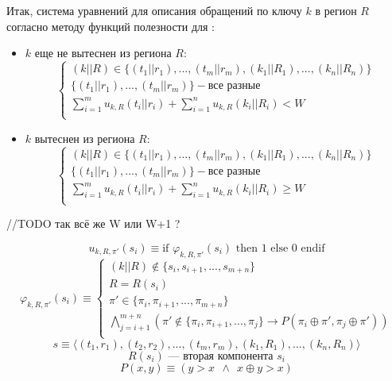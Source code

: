 Итак, система уравнений для описания обращений по ключу $k$ в регион $R$
согласно методу функций полезности для \PseudoLRU:
\begin{itemize}
\item $k$ еще не вытеснен из региона $R$:
$$
\left\{\begin{array}{l}
(k||R) \in \{(t_1||r_1), ..., (t_m||r_m), (k_1||R_1), ..., (k_n||R_n)\}\\
\{(t_1||r_1), ..., (t_m||r_m)\} - \mbox{все разные}\\
\sum\limits_{i=1}^m u_{k,R}(t_i||r_i) + \sum\limits_{i=1}^n u_{k,R}(k_i||R_i) < W\\
\end{array} \right.
$$
\item $k$ вытеснен из региона $R$:
$$
\left\{\begin{array}{l} (k||R) \in \{(t_1||r_1), ..., (t_m||r_m), (k_1||R_1),
..., (k_n||R_n)\}\\
\{(t_1||r_1), ..., (t_m||r_m)\} - \mbox{все разные}\\
\sum\limits_{i=1}^m u_{k,R}(t_i||r_i) + \sum\limits_{i=1}^n u_{k,R}(k_i||R_i) \geqslant W\\
\end{array} \right.
$$
\end{itemize}

//TODO так всё же W или W+1 ?

$$u_{k,R,\pi'} (s_i) \equiv \mbox{if~} \varphi_{k,R,\pi'} (s_i) \mbox{~then 1 else 0 endif}$$
$$\varphi_{k,R,\pi'} (s_i) \equiv \left\{\begin{array}{l}
(k||R) \notin \{s_i, s_{i+1}, ..., s_{m+n}\}\\
R = R(s_i)\\
\pi' \in \{\pi_i, \pi_{i+1}, ..., \pi_{m+n}\}\\
\bigwedge\limits_{j = i+1}^{m+n} (\pi' \notin \{\pi_i, \pi_{i+1}, ..., \pi_j\} \rightarrow P(\pi_i \oplus \pi', \pi_j \oplus \pi'))\\
\end{array}\right.
$$
$$s \equiv \langle (t_1,r_1), (t_2,r_2), ..., (t_m,r_m), (k_1, R_1), ..., (k_n,R_n) \rangle$$
$$R(s_i) \mbox{~--- вторая компонента~} s_i$$
$$P(x, y) \equiv (y > x~~\wedge~~x \oplus y > x)$$



